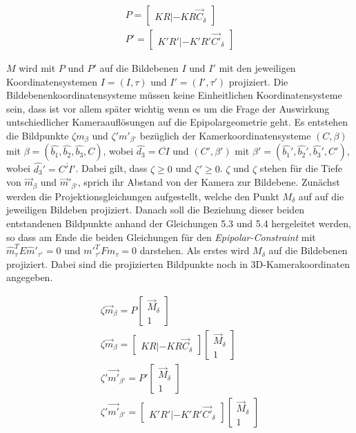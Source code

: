 \begin{gather}
P = \begin{bmatrix}
KR|-KR\vec{C}_\delta
\end{bmatrix}\\
P' = \begin{bmatrix}
K'R'|-K'R'\vec{C'}_\delta
\end{bmatrix}
\end{gather}

$M$ wird mit $P$ und $P'$ auf die Bildebenen $I$ und $I'$ mit den jeweiligen Koordinatensystemen $I = (I,\tau)$ und $I'= (I',\tau')$ projiziert. Die Bildebenenkoordinatensysteme müssen keine Einheitlichen Koordinatensysteme sein, dass ist vor allem später wichtig wenn es um die Frage der Auswirkung untschiedlicher Kameraauflösungen auf die Epipolargeometrie geht\cite{Elements}. Es entstehen die Bildpunkte $\zeta m_\beta$ und $\zeta' m'_{\beta'}$ bezüglich der Kamerkoordinatensysteme $(C,\beta)$ mit $\beta = (\hat{b_1},\hat{b_2},\hat{b_3},C)$, wobei $\hat{d_3}= \overline{CI}$ und $(C',\beta')$ mit $\beta' = (\hat{b_1}',\hat{b_2}',\hat{b_3}',C')$, wobei $\hat{d_3}'= \overline{C'I'}$. Dabei gilt, dass $\zeta \geq 0$ und $\zeta' \geq 0$. $\zeta$ und $\zeta$ stehen für die Tiefe von $\vec{m}_\beta$ und $\vec{m}'_{\beta'}$, sprich ihr Abstand von der Kamera zur Bildebene. Zunächst werden die Projektionsgleichungen aufgestellt, welche den Punkt $M_\delta$ auf auf die jeweiligen Bildeben projiziert. Danach soll die Beziehung dieser beiden entstandenen Bildpunkte anhand der Gleichungen 5.3 und 5.4 hergeleitet werden, so dass am Ende die beiden Gleichungen für den \textit{Epipolar-Constraint} mit $\hat{m}^T_\tau E \hat{m}'_{\tau'} = 0$ und $m'^T_{\tau'} Fm_\tau = 0$ darstehen. Als erstes wird $M_\delta$ auf die Bildebenen projiziert. Dabei sind die projizierten Bildpunkte noch in 3D-Kamerakoordinaten angegeben. 

\begin{gather}
\zeta \vec{m}_\beta = P \begin{bmatrix}\vec{M}_\delta\\1\end{bmatrix}\\
\zeta \vec{m}_\beta = \begin{bmatrix}KR|-KR\vec{C}_\delta\end{bmatrix}\begin{bmatrix}\vec{M}_\delta\\1\end{bmatrix}\\
\zeta'\vec{m'}_{\beta'} = P' \begin{bmatrix}\vec{M}_\delta\\1\end{bmatrix}\\
\zeta'\vec{m'}_{\beta'} = \begin{bmatrix}K'R'|-K'R'\vec{C'}_\delta\end{bmatrix}\begin{bmatrix}\vec{M}_\delta\\1\end{bmatrix}
\end{gather}

